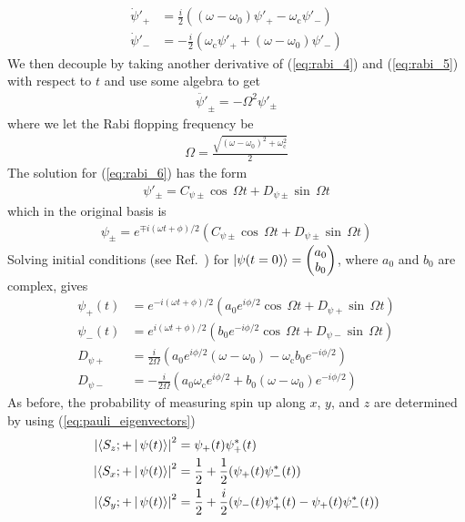 %
\begin{align}
    \dot{\psi}'_+ &= \frac{i}{2}((\omega - \omega_0)\psi'_+ - \omega_\text{c} \psi'_-)\label{eq:rabi_4}  \\
    \dot{\psi}'_- &= -\frac{i}{2}(\omega_\text{c}\psi'_+ + (\omega - \omega_0) \psi'_-)\label{eq:rabi_5} 
\end{align}
%
We then decouple by taking another derivative of (\ref{eq:rabi_4}) and (\ref{eq:rabi_5}) with respect to $t$ and use some algebra to get
%
\begin{gather}
     \ddot{\psi'}_{\pm} = -\Omega^2 \psi'_{\pm}\label{eq:rabi_6}
\end{gather}
%
where we let the Rabi flopping frequency be 
%
\begin{gather}
   \Omega=\frac{\sqrt{(\omega - \omega_0)^2+\omega_\text{c}^2}} {2}  \label{eq:rabi_freq}
\end{gather}
%
The solution for (\ref{eq:rabi_6}) has the form
%
\begin{gather}
    \psi'_\pm= C_{\psi\pm}\cos\,\Omega t + D_{\psi\pm}\sin\,\Omega t
\end{gather}
%
which in the original basis is
%
\begin{gather}
    \psi_\pm= e^{\mp i (\omega t+\phi)/2}\left( C_{\psi\pm}\cos\,\Omega t + D_{\psi\pm}\sin\,\Omega t \right)
\end{gather}
%
Solving initial conditions (see Ref.~\cite{may_thesis}) for
$\Ket{\psi(t=0)}=\left( \begin{matrix}
    a_0 \\
    b_0
\end{matrix}\right)$, where $a_0$ and $b_0$ are complex, gives
%
\begin{align}
    \psi_+(t) &= e^{-i(\omega t + \phi)/2}\left(a_0 e^{i\phi/2} \cos \, \Omega t + D_{\psi +} \sin \, \Omega t\right) \\
    \psi_-(t) &= e^{i(\omega t + \phi)/2}\left(b_0 e^{-i\phi/2} \cos \, \Omega t + D_{\psi -} \sin \, \Omega t\right) \\
    D_{\psi +} &= \frac{i}{2\Omega}\left( a_0 e^{i\phi/2} (\omega - \omega_0) - \omega_\text{c}b_0 e^{-i\phi/2} \right) \\
    D_{\psi -} &= -\frac{i}{2\Omega} \left(a_0 \omega_\text{c}e^{i\phi/2} + b_0(\omega -\omega_0)e^{-i\phi/2} \right)
\end{align}
%
As before, the probability of measuring spin up along $x$, $y$, and $z$ are determined by using (\ref{eq:pauli_eigenvectors})
%
\begin{align}
    \left| \Braket{S_z;+ | \psi(t)} \right|^2&= \psi_+(t)\psi_+^*(t) \label{eq:rabi_circ_z} \\
    \left| \Braket{S_x;+ | \psi(t)} \right|^2&= \frac{1}{2} + \frac{1}{2}( \psi_+(t)\psi_-^*(t)) \label{eq:rabi_circ_x} \\
    \left| \Braket{S_y;+ | \psi(t)} \right|^2&= \frac{1}{2} + \frac{i}{2}( \psi_-(t)\psi_+^*(t) - \psi_+(t)\psi_-^*(t) ) \label{eq:rabi_circ_y}
\end{align}

